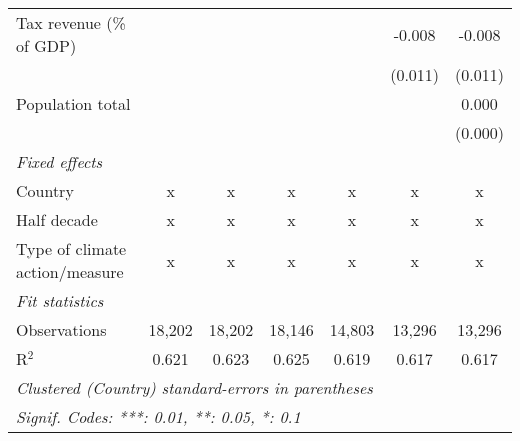 \begin{tabular}{lcccccc}
   Tax revenue (\% of GDP)               &         &               &               &               & -0.008        & -0.008\\   
                                         &         &               &               &               & (0.011)       & (0.011)\\   
   Population total                      &         &               &               &               &               & 0.000\\   
                                         &         &               &               &               &               & (0.000)\\   
   \emph{Fixed effects}\\
   Country                               & x       & x             & x             & x             & x             & x\\  
   Half decade                           & x       & x             & x             & x             & x             & x\\  
   Type of climate action/measure        & x       & x             & x             & x             & x             & x\\  
   \midrule \emph{Fit statistics}\\
   Observations                          & 18,202  & 18,202        & 18,146        & 14,803        & 13,296        & 13,296\\  
   R$^2$                                 & 0.621   & 0.623         & 0.625         & 0.619         & 0.617         & 0.617\\  
   \midrule
   \multicolumn{7}{l}{\emph{Clustered (Country) standard-errors in parentheses}}\\
   \multicolumn{7}{l}{\emph{Signif. Codes: ***: 0.01, **: 0.05, *: 0.1}}\\
\end{tabular}
\par\endgroup



